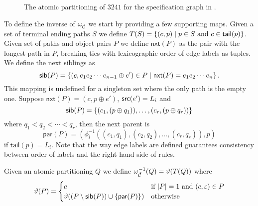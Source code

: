 \begin{figure}[ht!]
    \centering
    
    \caption{The atomic partitioning of $3241$ for the specification graph in .}
    \label{fig:atomic_partitioning}
\end{figure}

To define the inverse of $\omega_{\check{\mathcal{C}}}$ we start by providing a few supporting maps. Given a set of terminal ending paths $S$ we define $T(S) = \left\{(c,p) \mid p \in S \text{ and } c \in \textsf{tail}(p)\right\}$. Given set of paths and object pairs $P$ we define $\textsf{nxt}(P)$ as the pair with the longest path in $P$, breaking ties with lexicographic order of edge labels as tuples. We define the next siblings as
\[
    \textsf{sib}(P) = \left\{(c, e_1e_2 \dotsm e_{n-1} \oplus e') \in P \mid \textsf{nxt}(P) = e_1e_2 \dotsm e_n\right\}.
\]
This mapping is undefined for a singleton set where the only path is the empty one. Suppose $\textsf{nxt}(P) = (c, p \oplus e')$, $\textsf{src}(e') = L_i$ and 
\[
    \textsf{sib}(P) = \left\{(c_1, (p \oplus q_1)),\dotsc, (c_r, (p \oplus q_r))\right\}
\]
where $q_1 < q_2 < \dotsm < q_r$, then the next parent is
\[
    \textsf{par}(P) = (\phi^{-1}_i((c_1,q_1), (c_2,q_2), \dotsc, (c_r,q_r)),p)
\]
if $\textsf{tail}(p) = L_i$. Note that the way edge labels are defined guarantees consistency between order of labels and the right hand side of rules.

Given an atomic partitioning $Q$ we define $\omega^{-1}_{\check{\mathcal{C}}}(Q) = \vartheta(T(Q))$ where
\[
    \vartheta(P) = \begin{cases}
        c & \text{if } |P| = 1 \text{ and } (c, \varepsilon) \in P\\
        \vartheta(\left(P \setminus \textsf{sib}(P)\right) \cup \left\{\textsf{par}(P)\right\}) & \text{otherwise}
    \end{cases}
\]

